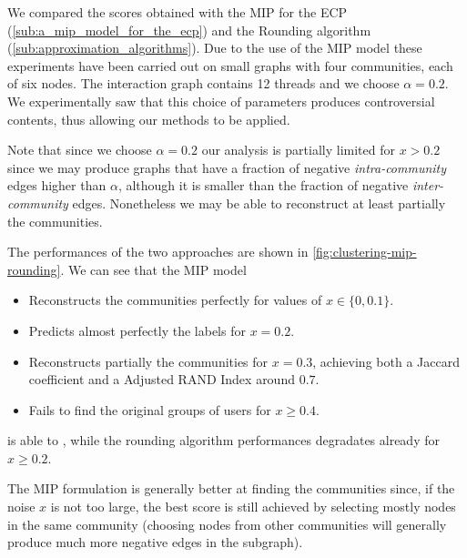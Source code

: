 We compared the scores obtained with the \acrshort{MIP} for the \acrshort{ECP}
(\autoref{sub:a_mip_model_for_the_ecp}) and the Rounding algorithm
(\autoref{sub:approximation_algorithms}). Due to the use of the
\acrshort{MIP} model these experiments have been carried out on
small graphs with four communities, each of six nodes. The interaction graph
contains 12 threads and we choose $\alpha = 0.2$. We experimentally saw that
this choice of parameters produces controversial contents, thus allowing our
methods to be applied.

Note that since we choose $\alpha = 0.2$ our analysis is partially limited for $x
	> 0.2$ since we may produce graphs that have a fraction of negative
\emph{intra-community} edges
higher than $\alpha $, although it is smaller than the fraction of negative
\emph{inter-community} edges. Nonetheless we may be able to reconstruct at least
partially the communities.

The performances of the two approaches are shown in
\autoref{fig:clustering-mip-rounding}. We can see that the MIP model
\begin{itemize}
	\item Reconstructs the communities perfectly for values of $x \in \{0,
		      0.1\}$.
	\item Predicts almost perfectly the labels for $x= 0.2$.
	\item Reconstructs partially the communities for $x = 0.3$, achieving both
	      a Jaccard coefficient and a Adjusted RAND Index around $0.7$.
	\item Fails to find the original groups of users for $x \geq 0.4$.
\end{itemize}
is able to
, while the rounding
algorithm performances degradates already for $x \geq 0.2$.

The MIP formulation is generally better at finding the communities since, if
the noise $x$ is not too large, the best score is still achieved
by selecting mostly nodes in the same community (choosing nodes from other
communities will generally produce much more negative edges in the subgraph).

